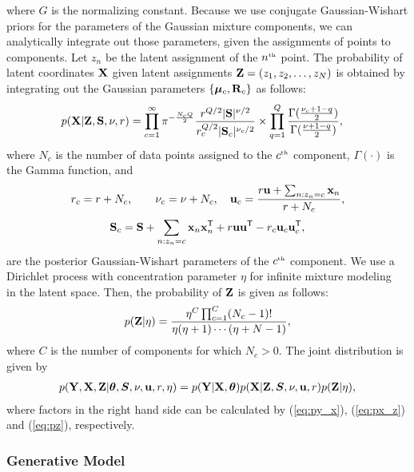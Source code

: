 where $G$ is the normalizing constant.
Because we use conjugate Gaussian-Wishart priors for the parameters of the Gaussian mixture components, we can analytically integrate out those parameters, given the assignments of points to components.
Let $z_{n}$ be the latent assignment of the $n^{\text{\tiny th}}$ point.
The probability of latent coordinates $\mathbf{X}$ given latent assignments $\mathbf{Z}=(z_1, z_2, \dots, z_N)$ is obtained by integrating out the Gaussian parameters $\{{\boldsymbol{\mu}}_c,\mathbf{R}_c\}$ as follows:
%
\begin{align}
p(\mathbf{X}|\mathbf{Z},\mathbf{S},\nu,r) &= \prod_{c=1}^{\infty}
\pi^{-\frac{N_{c}Q}{2}}\frac{r^{Q/2}|\mathbf{S}|^{\nu/2}}{r_{c}^{Q/2}|\mathbf{S}_{c}|^{\nu_{c}/2}}
\times \prod_{q=1}^{Q}\frac{\Gamma(\frac{\nu_{c}+1-q}{2})}{\Gamma(\frac{\nu+1-q}{2})},
\label{eq:px_z}
\end{align}
%
where
$N_c$ is the number of data points assigned to the $c^{\text{\tiny th}}$ component,
$\Gamma(\cdot)$ is the Gamma function, and
%
\begin{align}
r_{c}=r+N_{c}, \hspace{2em}
\nu_{c}=\nu+N_{c}, 
\quad
{\bf{u}}_{c}=\frac{r{\bf{u}}+\sum_{n:z_{n}=c}{\bf{x}}_{n}}{r+N_{c}}, 
\nonumber
\end{align}
%
\begin{align}
\mathbf{S}_{c}=\mathbf{S}+\sum_{n:z_{n}=c}{\bf{x}}_{n}{\bf{x}}_{n}^{\mathsf{T}} + r{\bf{u}}{\bf{u}}^{\mathsf{T}}
 - r_{c}{\bf{u}}_{c}{\bf{u}}_{c}^{\mathsf{T}},
\end{align}
%
are the posterior Gaussian-Wishart parameters of the $c^{\text{\tiny th}}$ component.
We use a Dirichlet process with concentration parameter $\eta$ for infinite mixture modeling~\citep{maceachern1998estimating} in the latent space.
Then, the probability of $\mathbf{Z}$ is given as follows:
%
\begin{align}
p(\mathbf{Z}|\eta) = 
\frac{\eta^{C}\prod_{c=1}^{C}(N_{c}-1)!}
{\eta(\eta+1)\cdots(\eta+N-1)},
\label{eq:pz}
\end{align}
%
where $C$ is the number of components for which $N_{c}>0$.
The joint distribution is given by
%
\begin{align}
p(\mathbf{Y},\mathbf{X},\mathbf{Z}|\bm{\theta},\bm{S},\nu,{\bf{u}},r,\eta)
 = p(\mathbf{Y}|\mathbf{X},\bm{\theta})
 p(\mathbf{X}|\mathbf{Z},\bm{S},\nu,{\bf{u}},r)p(\mathbf{Z}|\eta),
\label{eq:joint}
\end{align}
%
where factors in the right hand side can be calculated by (\ref{eq:py_x}), (\ref{eq:px_z}) and (\ref{eq:pz}), respectively.

\subsubsection{Generative Model}

